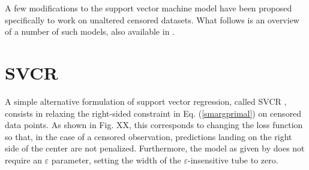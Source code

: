 \documentclass[12pt]{report}
\begin{document}
A few modifications to the support vector machine model have been proposed specifically to work on unaltered censored datasets. What follows is an overview of a number of such models, also available in \cite{vanbelle11}.

\section{SVCR}
A simple alternative formulation of support vector regression, called SVCR \cite{shivaswamy07}, consists in relaxing the right-sided constraint in Eq. (\ref{smargprimal}) on censored data points. As shown in Fig. XX, this corresponds to changing the loss function so that, in the case of a censored observation, predictions landing on the right side of the center are not penalized. Furthermore, the model as given by \cite{vanbelle11} does not require an $\varepsilon$ parameter, setting the width of the $\varepsilon$-insensitive tube to zero.
\end{document}

